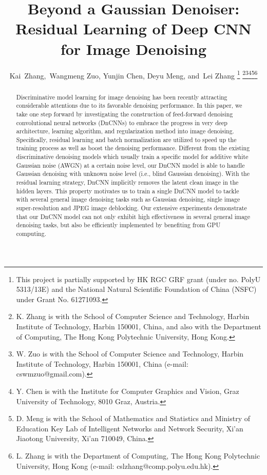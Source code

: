 \documentclass[journal]{IEEEtran}
\begin{document}
\title{Beyond a Gaussian Denoiser: Residual Learning of Deep CNN for Image Denoising}




\author{Kai~Zhang,~Wangmeng Zuo,
        Yunjin Chen,
        Deyu Meng,
        and~Lei Zhang
\thanks{This project is partially supported by HK RGC GRF grant (under no. PolyU 5313/13E) and the National Natural Scientific Foundation of China (NSFC) under Grant No. 61271093.}
\thanks{K. Zhang is with the School of Computer Science and Technology, Harbin
Institute of Technology, Harbin 150001, China, and also with the Department
of Computing, The Hong Kong Polytechnic University, Hong Kong.}\thanks{W. Zuo is with the School of Computer Science and
Technology, Harbin Institute of Technology, Harbin 150001, China (e-mail:
cswmzuo@gmail.com).}\thanks{Y. Chen is with the Institute for Computer Graphics and Vision, Graz
University of Technology, 8010 Graz, Austria.}\thanks{D. Meng is with the School of Mathematics and Statistics and Ministry of Education Key Lab of Intelligent
Networks and Network Security, Xi'an Jiaotong University, Xi'an 710049, China.}\thanks{L. Zhang is with the Department of Computing, The Hong Kong
Polytechnic University, Hong Kong (e-mail: cslzhang@comp.polyu.edu.hk).}
}











\maketitle

\begin{abstract}
Discriminative model learning for image denoising has been recently attracting considerable attentions due to its favorable denoising performance.
In this paper, we take one step forward by investigating the construction of feed-forward denoising convolutional neural networks (DnCNNs) to embrace the progress in very deep architecture, learning algorithm, and regularization method into image denoising. Specifically, residual learning and batch normalization are utilized to speed up the training process as well as boost the denoising performance. Different from the existing discriminative denoising models which usually train a specific model for additive white Gaussian noise (AWGN) at a certain noise level, our DnCNN model is able to handle Gaussian denoising with unknown noise level (i.e., blind Gaussian denoising). With the residual learning strategy, DnCNN implicitly removes the latent clean image in the hidden layers. This property motivates us to train a single DnCNN model to tackle with several general image denoising tasks such as Gaussian denoising, single image super-resolution and JPEG image deblocking. Our extensive experiments demonstrate that our DnCNN model can not only exhibit high effectiveness in several general image denoising tasks, but also be efficiently implemented by benefiting from GPU computing.
\end{abstract}
\end{document}
